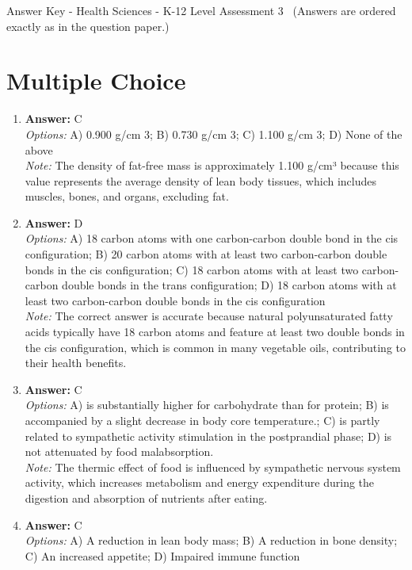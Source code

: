 \documentclass[12pt]{article}
\begin{document}
\begin{center}
Answer Key - Health Sciences - K-12 Level Assessment 3 \
\small (Answers are ordered exactly as in the question paper.)
\end{center}

\section*{Multiple Choice}
\begin{enumerate}[label=\arabic*.]
\item \textbf{Answer:} C
\\ \textit{Options:} A) 0.900 g/cm 3; B) 0.730 g/cm 3; C) 1.100 g/cm 3; D) None of the above
\\ \textit{Note:} The density of fat-free mass is approximately 1.100 g/cm³ because this value represents the average density of lean body tissues, which includes muscles, bones, and organs, excluding fat.
\item \textbf{Answer:} D
\\ \textit{Options:} A) 18 carbon atoms with one carbon-carbon double bond in the cis configuration; B) 20 carbon atoms with at least two carbon-carbon double bonds in the cis configuration; C) 18 carbon atoms with at least two carbon-carbon double bonds in the trans configuration; D) 18 carbon atoms with at least two carbon-carbon double bonds in the cis configuration
\\ \textit{Note:} The correct answer is accurate because natural polyunsaturated fatty acids typically have 18 carbon atoms and feature at least two double bonds in the cis configuration, which is common in many vegetable oils, contributing to their health benefits.
\item \textbf{Answer:} C
\\ \textit{Options:} A) is substantially higher for carbohydrate than for protein; B) is accompanied by a slight decrease in body core temperature.; C) is partly related to sympathetic activity stimulation in the postprandial phase; D) is not attenuated by food malabsorption.
\\ \textit{Note:} The thermic effect of food is influenced by sympathetic nervous system activity, which increases metabolism and energy expenditure during the digestion and absorption of nutrients after eating.
\item \textbf{Answer:} C
\\ \textit{Options:} A) A reduction in lean body mass; B) A reduction in bone density; C) An increased appetite; D) Impaired immune function

\end{enumerate}
\end{document}
